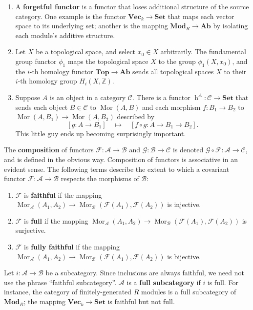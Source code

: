 \documentclass[11pt]{article}
\newcommand{\Mor}{\operatorname{Mor}}
\newcommand{\h}{\operatorname{h}}
\newcommand{\A}{\mathscr{A}}
\newcommand{\B}{\mathscr{B}}
\newcommand{\C}{\mathscr{C}}
\newcommand{\F}{\mathcal{F}}
\newcommand{\G}{\mathcal{G}}
\begin{document}
\begin{enumerate}
  \item A \textbf{forgetful functor} is a functor that loses additional structure of the source category. One example is the functor $\mathbf{Vec}_{k} \to \mathbf{Set}$ that maps each vector space to its underlying set; another is the mapping $\mathbf{Mod}_{R} \to \mathbf{Ab}$ by isolating each module's additive structure.
  \item Let $X$ be a topological space, and select $x_{0} \in X$ arbitrarily. The fundamental group functor $\phi_{1}$ maps the topological space $X$ to the group $\phi_{1}(X, x_{0})$, and the $i$-th homology functor $\mathbf{Top} \to \mathbf{Ab}$ sends all topological spaces $X$ to their $i$-th homology group $H_{i}(X, \mathbb{Z})$.
  \item Suppose $A$ is an object in a category $\C$. There is a functor $\h^{A} : \mathcal{C} \to \mathbf{Set}$ that sends each object $B \in \C$ to $\Mor(A, B)$ and each morphism $f : B_{1} \to B_{2}$ to $\Mor(A, B_{1}) \to \Mor(A, B_{2})$ described by
  \[
    [g : A \to B_{1}] \quad \mapsto \quad [f \circ g : A \to B_{1} \to B_{2}].
  \]
  This little guy ends up becoming surprisingly important.
\end{enumerate}
The \textbf{composition} of functors $\F : \A \to \B$ and $\G : \B \to \C$ is denoted $\G \circ \F : \A \to \C$, and is defined in the obvious way. Composition of functors is associative in an evident sense. The following terms describe the extent to which a covariant functor $\F : \A \to \B$ respects the morphisms of $\B$:
\begin{enumerate}
  \item $\F$ is \textbf{faithful} if the mapping $\Mor_{\A}(A_{1}, A_{2}) \to \Mor_{\B}(\F(A_{1}), \F(A_{2}))$ is injective.
  \item $\F$ is \textbf{full} if the mapping $\Mor_{\A}(A_{1}, A_{2}) \to \Mor_{\B}(\F(A_{1}), \F(A_{2}))$ is surjective.
  \item $\F$ is \textbf{fully faithful} if the mapping $\Mor_{\A}(A_{1}, A_{2}) \to \Mor_{\B}(\F(A_{1}), \F(A_{2}))$ is bijective.
\end{enumerate}
Let $i : \A \to \B$ be a subcategory. Since inclusions are always faithful, we need not use the phrase ``faithful subcategory''. $\A$ is a \textbf{full subcategory} if $i$ is full. For instance, the category of finitely-generated $R$ modules is a full subcategory of $\mathbf{Mod}_{R}$; the mapping $\mathbf{Vec}_{k} \to \mathbf{Set}$ is faithful but not full.
\end{document}
